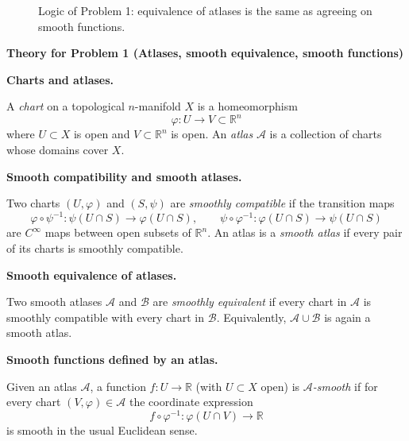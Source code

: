 \begin{solution}
\begin{figure}[htbp]
	\caption{Logic of Problem 1: equivalence of atlases is the same as agreeing on smooth functions.}
\end{figure}






\par\medskip\noindent\textbf{Theory for Problem 1 (Atlases, smooth equivalence, smooth functions)}\par\smallskip


\par\medskip\noindent\textbf{Charts and atlases.}\par\smallskip

A \emph{chart} on a topological $n$-manifold $X$ is a homeomorphism
\[
\varphi:U\longrightarrow V\subset \mathbb R^n
\]
where $U\subset X$ is open and $V\subset\mathbb R^n$ is open.
An \emph{atlas} $\mathcal A$ is a collection of charts whose domains cover $X$.

\par\medskip\noindent\textbf{Smooth compatibility and smooth atlases.}\par\smallskip

Two charts $(U,\varphi)$ and $(S,\psi)$ are \emph{smoothly compatible} if the transition maps
\[
\varphi\circ \psi^{-1}:\psi(U\cap S)\to \varphi(U\cap S),
\qquad
\psi\circ \varphi^{-1}:\varphi(U\cap S)\to \psi(U\cap S)
\]
are $C^\infty$ maps between open subsets of $\mathbb R^n$.
An atlas is a \emph{smooth atlas} if every pair of its charts is smoothly compatible.

\par\medskip\noindent\textbf{Smooth equivalence of atlases.}\par\smallskip

Two smooth atlases $\mathcal A$ and $\mathcal B$ are \emph{smoothly equivalent} if every chart in $\mathcal A$
is smoothly compatible with every chart in $\mathcal B$.
Equivalently, $\mathcal A\cup\mathcal B$ is again a smooth atlas.

\par\medskip\noindent\textbf{Smooth functions defined by an atlas.}\par\smallskip

Given an atlas $\mathcal A$, a function $f:U\to\mathbb R$ (with $U\subset X$ open) is \emph{$\mathcal A$-smooth}
if for every chart $(V,\varphi)\in\mathcal A$ the coordinate expression
\[
f\circ \varphi^{-1}:\varphi(U\cap V)\to \mathbb R
\]
is smooth in the usual Euclidean sense.


\end{solution}
